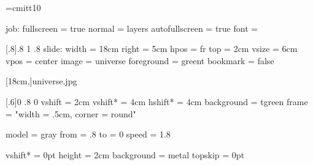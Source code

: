 %
% 
%



\font\ttit=cmitt10

\setparameter job:
  fullscreen     = true
  normal         = layers
  autofullscreen = true
  font           = \tt

[.8]{.8 1 .8}
\setparameter slide:
  width      = 18cm
  right      = 5cm
  hpos       = fr
  top        = 2cm
  vsize      = 6cm
  vpos       = center
  image      = universe
  foreground = greent
  bookmark   = false

[18cm,]{universe.jpg}

  
%
%
[.6]{0 .8 0}
  vshift     = 2cm
  vshift*    = 4cm
  hshift*    = 4cm
  background = tgreen
  frame      = "width = .5cm, corner = round"


%
%
  model = gray
  from  = .8
  to    = 0
  speed = 1.8

  vshift*    = 0pt
  height     = 2cm
  background = metal
  topskip    = 0pt

